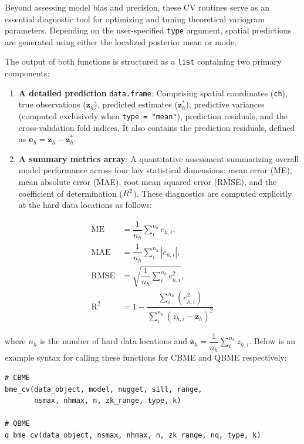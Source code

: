 Beyond assessing model bias and precision, these CV routines serve as an essential diagnostic tool for optimizing and tuning theoretical variogram parameters. Depending on the user-specified \texttt{type} argument, spatial predictions are generated using either the localized posterior mean or mode.

The output of both functions is structured as a \texttt{list} containing two primary components:

\begin{enumerate}
\def\labelenumi{\arabic{enumi}.}
\item
  \textbf{A detailed prediction} \texttt{data.frame}: Comprising spatial coordinates (\texttt{ch}), true observations (\(\boldsymbol{z}_h\)), predicted estimates (\(\boldsymbol{z}^\ast_h\)), predictive variances (computed exclusively when \texttt{type\ =\ "mean"}), prediction residuals, and the cross-validation fold indices. It also contains the prediction residuals, defined as \(\boldsymbol{e}_h = \boldsymbol{z}_h - \boldsymbol{z}^\ast_h\).
\item
  \textbf{A summary metrics array}: A quantitative assessment summarizing overall model performance across four key statistical dimensions: mean error (ME), mean absolute error (MAE), root mean squared error (RMSE), and the coefficient of determination (\(R^{\scriptsize 2}\)). These diagnostics are computed explicitly at the hard data locations as follows:
\end{enumerate}

\vspace{-1em}

\begin{align*}
\mathrm{ME} &= \dfrac{1}{n_h} \sum^{n_h}_{i} e_{h,i}, \\  
\mathrm{MAE} &= \dfrac{1}{n_h} \sum^{n_h}_{i} {|e_{h,i}|}, \\  
\mathrm{RMSE} &= \sqrt{\dfrac{1}{n_h} \sum^{n_h}_{i} e^2_{h,i}}, \\
\mathrm{R}^2 &= 1 - \dfrac{\sum^{n_h}_{i}(e_{h,i}^2)}{\sum^{n_h}_{i}(z_{h,i} - \bar{\boldsymbol{z}}_{h})^2}
\end{align*}

where \(n_h\) is the number of hard data locations and \(\bar{\boldsymbol{z}}_{h} = \dfrac{1}{n_h}\sum^{n_h}_{i}z_{h,i}\). Below is an example syntax for calling these functions for CBME and QBME respectively:

\begin{verbatim}
# CBME
bme_cv(data_object, model, nugget, sill, range,
       nsmax, nhmax, n, zk_range, type, k)

# QBME
q_bme_cv(data_object, nsmax, nhmax, n, zk_range, nq, type, k)
\end{verbatim}

